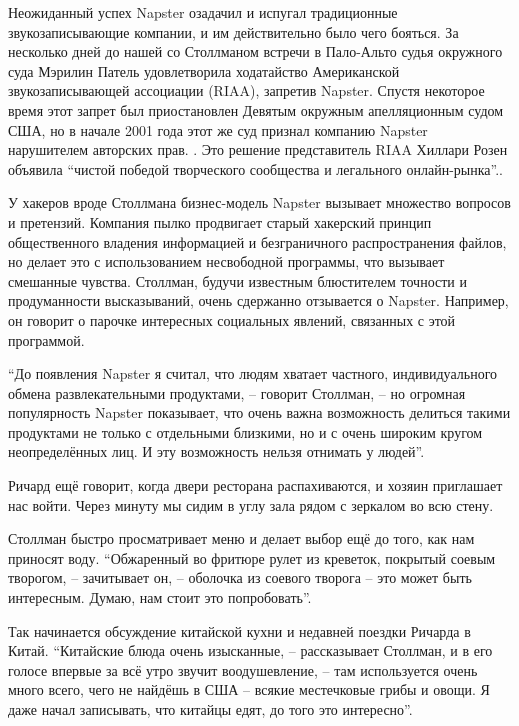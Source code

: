 Неожиданный успех Napster озадачил и испугал традиционные звукозаписывающие компании, и им действительно было чего бояться. За несколько дней до нашей со Столлманом встречи в Пало-Альто судья окружного суда Мэрилин Патель удовлетворила ходатайство Американской звукозаписывающей ассоциации (RIAA), запретив Napster. Спустя некоторое время этот запрет был приостановлен Девятым окружным апелляционным судом США, но в начале 2001 года этот же суд признал компанию Napster нарушителем авторских прав. . Это решение представитель RIAA Хиллари Розен объявила \enquote{чистой победой творческого сообщества и легального онлайн-рынка}..

У хакеров вроде Столлмана бизнес-модель Napster вызывает множество вопросов и претензий. Компания пылко продвигает старый хакерский принцип общественного владения информацией и безграничного распространения файлов, но делает это с использованием несвободной программы, что вызывает смешанные чувства. Столлман, будучи известным блюстителем точности и продуманности высказываний, очень сдержанно отзывается о Napster. Например, он говорит о парочке интересных социальных явлений, связанных с этой программой.

\enquote{До появления Napster я считал, что людям хватает частного, индивидуального обмена развлекательными продуктами, -- говорит Столлман, -- но огромная популярность Napster показывает, что очень важна возможность делиться такими продуктами не только с отдельными близкими, но и с очень широким кругом неопределённых лиц. И эту возможность нельзя отнимать у людей}.

Ричард ещё говорит, когда двери ресторана распахиваются, и хозяин приглашает нас войти. Через минуту мы сидим в углу зала рядом с зеркалом во всю стену.

Столлман быстро просматривает меню и делает выбор ещё до того, как нам приносят воду. \enquote{Обжаренный во фритюре рулет из креветок, покрытый соевым творогом, -- зачитывает он, -- оболочка из соевого творога -- это может быть интересным. Думаю, нам стоит это попробовать}.

Так начинается обсуждение китайской кухни и недавней поездки Ричарда в Китай. \enquote{Китайские блюда очень изысканные, -- рассказывает Столлман, и в его голосе впервые за всё утро звучит воодушевление, -- там используется очень много всего, чего не найдёшь в США -- всякие местечковые грибы и овощи. Я даже начал записывать, что китайцы едят, до того это интересно}.

